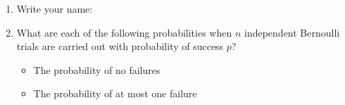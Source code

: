 \documentclass[12pt,twoside]{article}
\begin{document}


\begin{enumerate}
\item Write your name:
\item What are each of the following probabilities when $n$ independent Bernoulli trials are carried out with probability of success $p$?
\begin{itemize}
\item The probability of no failures
\item The probability of at most one failure
\end{itemize}
\end{enumerate}

\newpage
\thispagestyle{empty}
\mbox{}
\setcounter{page}{0}
\newpage

\end{document}
